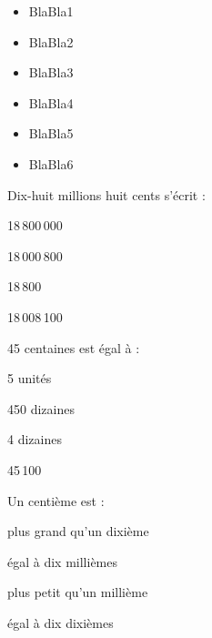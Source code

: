 \begin{acquis}
\begin{itemize}
\item BlaBla1
\item BlaBla2
\item BlaBla3
\item BlaBla4
\item BlaBla5
\item BlaBla6
\end{itemize}
\end{acquis}



\begin{QCM}
  \begin{GroupeQCM} 
    \begin{exercice}
      Dix-huit millions huit cents s'écrit :
      \begin{ChoixQCM}{4}
      \item 18\,800\,000
      \item 18\,000\,800
      \item 18\,800
      \item 18\,008\,100
      \end{ChoixQCM}
\begin{corrige}
   \end{corrige}
    \end{exercice}

    \begin{exercice}
      45 centaines est égal à :
      \begin{ChoixQCM}{4}
      \item 5 unités
      \item 450 dizaines
      \item 4 dizaines
      \item 45\,100
      \end{ChoixQCM}
      \begin{corrige}
   \end{corrige}
    \end{exercice}

    
    \begin{exercice}
      Un centième est :
      \begin{ChoixQCM}{4}
      \item plus grand qu'un dixième
      \item égal à dix millièmes
      \item plus petit qu'un millième
      \item égal à dix  dixièmes
      \end{ChoixQCM}
      \begin{corrige}
   \end{corrige}
    \end{exercice}



\end{GroupeQCM}
\end{QCM}
